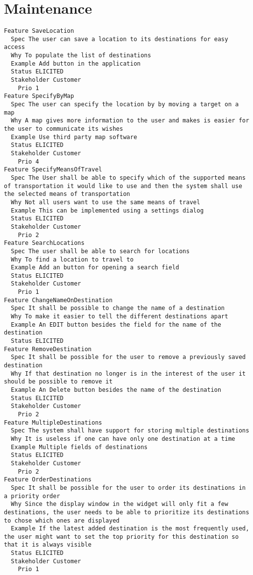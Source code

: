         
       \section{Maintenance}


\begin{lstlisting}
Feature SaveLocation
  Spec The user can save a location to its destinations for easy access
  Why To populate the list of destinations
  Example Add button in the application
  Status ELICITED
  Stakeholder Customer
    Prio 1
Feature SpecifyByMap
  Spec The user can specify the location by by moving a target on a map
  Why A map gives more information to the user and makes is easier for the user to communicate its wishes
  Example Use third party map software
  Status ELICITED
  Stakeholder Customer
    Prio 4
Feature SpecifyMeansOfTravel
  Spec The User shall be able to specify which of the supported means of transportation it would like to use and then the system shall use the selected means of transportation
  Why Not all users want to use the same means of travel
  Example This can be implemented using a settings dialog
  Status ELICITED
  Stakeholder Customer
    Prio 2
Feature SearchLocations
  Spec The user shall be able to search for locations
  Why To find a location to travel to
  Example Add an button for opening a search field
  Status ELICITED
  Stakeholder Customer
    Prio 1
Feature ChangeNameOnDestination
  Spec It shall be possible to change the name of a destination
  Why To make it easier to tell the different destinations apart
  Example An EDIT button besides the field for the name of the destination
  Status ELICITED
Feature RemoveDestination
  Spec It shall be possible for the user to remove a previously saved destination
  Why If that destination no longer is in the interest of the user it should be possible to remove it
  Example An Delete button besides the name of the destination
  Status ELICITED
  Stakeholder Customer
    Prio 2
Feature MultipleDestinations
  Spec The system shall have support for storing multiple destinations
  Why It is useless if one can have only one destination at a time
  Example Multiple fields of destinations
  Status ELICITED
  Stakeholder Customer
    Prio 2
Feature OrderDestinations
  Spec It shall be possible for the user to order its destinations in a priority order
  Why Since the display window in the widget will only fit a few destinations, the user needs to be able to prioritize its destinations to chose which ones are displayed
  Example If the latest added destination is the most frequently used, the user might want to set the top priority for this destination so that it is always visible
  Status ELICITED
  Stakeholder Customer
    Prio 1

\end{lstlisting}
    
